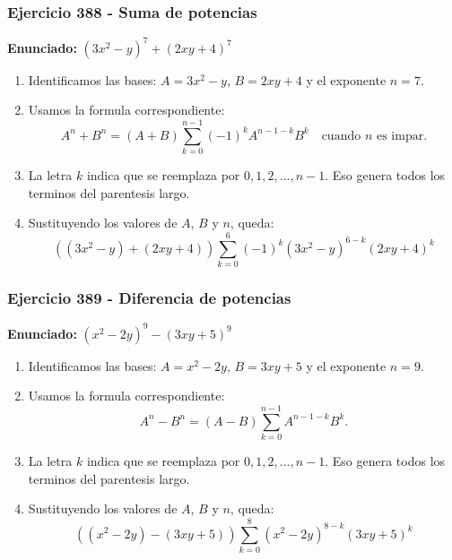 \documentclass[11pt,a4paper]{article}
\begin{document}
\subsubsection*{Ejercicio 388 - Suma de potencias}
\textbf{Enunciado:} $ \left(3 x^{2} - y\right)^{7}+\left(2 x y + 4\right)^{7} $\par
\begin{enumerate}[leftmargin=2em]
\item Identificamos las bases: \(A=3 x^{2} - y\), \(B=2 x y + 4\) y el exponente \(n=7\).
\item Usamos la formula correspondiente: \[A^n+B^n=(A+B)\sum_{k=0}^{n-1}(-1)^kA^{n-1-k}B^k\quad\text{cuando }n\text{ es impar}.\]
\item La letra \(k\) indica que se reemplaza por \(0,1,2,\ldots,n-1\). Eso genera todos los terminos del parentesis largo.
\item Sustituyendo los valores de \(A\), \(B\) y \(n\), queda: \[\boxed{\left(\left(3 x^{2} - y\right)+\left(2 x y + 4\right)\right)\sum_{k=0}^{6}(-1)^k\left(3 x^{2} - y\right)^{6-k}\left(2 x y + 4\right)^k}\]
\end{enumerate}

\vspace{0.2cm}
\subsubsection*{Ejercicio 389 - Diferencia de potencias}
\textbf{Enunciado:} $ \left(x^{2} - 2 y\right)^{9}-\left(3 x y + 5\right)^{9} $\par
\begin{enumerate}[leftmargin=2em]
\item Identificamos las bases: \(A=x^{2} - 2 y\), \(B=3 x y + 5\) y el exponente \(n=9\).
\item Usamos la formula correspondiente: \[A^n-B^n=(A-B)\sum_{k=0}^{n-1}A^{n-1-k}B^k.\]
\item La letra \(k\) indica que se reemplaza por \(0,1,2,\ldots,n-1\). Eso genera todos los terminos del parentesis largo.
\item Sustituyendo los valores de \(A\), \(B\) y \(n\), queda: \[\boxed{\left(\left(x^{2} - 2 y\right)-\left(3 x y + 5\right)\right)\sum_{k=0}^{8}\left(x^{2} - 2 y\right)^{8-k}\left(3 x y + 5\right)^k}\]
\end{enumerate}

\vspace{0.2cm}
\end{document}
